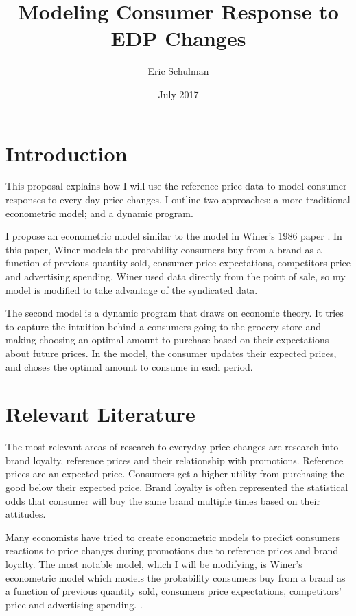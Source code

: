 \documentclass{article}
\title{Modeling Consumer Response to EDP Changes}
\author{Eric Schulman}
\date{July 2017}
\begin{document}
\maketitle

\section{Introduction}

This proposal explains how I will use the reference price data to model consumer responses to every day price changes. I outline two approaches: a more traditional econometric model; and a dynamic program.

I propose an econometric model similar to the model in Winer's 1986 paper \cite{winer}. In this paper, Winer models the probability consumers buy from a brand as a function of previous quantity sold, consumer price expectations, competitors price and advertising spending. Winer used data directly from the point of sale, so my model is modified to take advantage of the syndicated data.

The second model is a dynamic program that draws on economic theory. It tries to capture the intuition behind a consumers going to the grocery store and making choosing an optimal amount to purchase based on their expectations about future prices. In the model, the consumer updates their expected prices, and choses the optimal amount to consume in each period.

\section{Relevant Literature}

The most relevant areas of research to everyday price changes are research into brand loyalty, reference prices and their relationship with promotions. Reference prices are an expected price. Consumers get a higher utility from purchasing the good below their expected price. Brand loyalty is often represented the statistical odds that consumer will buy the same brand multiple times based on their attitudes. 

Many economists have tried to create econometric models to predict consumers reactions to price changes during promotions due to reference prices and brand loyalty. The most notable model, which I will be modifying, is Winer's econometric model which models the probability consumers buy from a brand as a function of previous quantity sold, consumers price expectations, competitors' price and advertising spending.  \cite{winer}.
\end{document}
